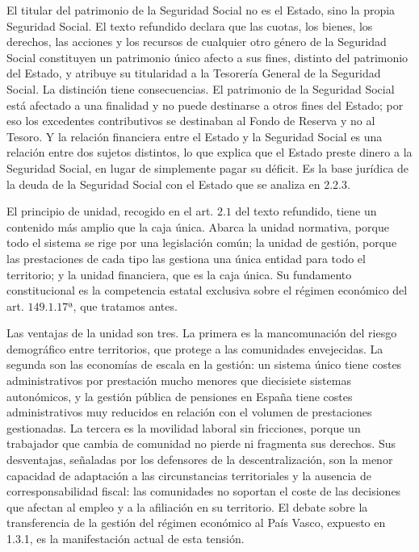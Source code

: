 \documentclass[10pt,a4paper]{article}
\begin{document}
El titular del patrimonio de la Seguridad Social no es el Estado, sino la propia Seguridad Social. El texto refundido declara que las cuotas, los bienes, los derechos, las acciones y los recursos de cualquier otro género de la Seguridad Social constituyen un patrimonio único afecto a sus fines, distinto del patrimonio del Estado, y atribuye su titularidad a la Tesorería General de la Seguridad Social. La distinción tiene consecuencias. El patrimonio de la Seguridad Social está afectado a una finalidad y no puede destinarse a otros fines del Estado; por eso los excedentes contributivos se destinaban al Fondo de Reserva y no al Tesoro. Y la relación financiera entre el Estado y la Seguridad Social es una relación entre dos sujetos distintos, lo que explica que el Estado preste dinero a la Seguridad Social, en lugar de simplemente pagar su déficit. Es la base jurídica de la deuda de la Seguridad Social con el Estado que se analiza en 2.2.3.

El principio de unidad, recogido en el art. $2.1$ del texto refundido, tiene un contenido más amplio que la caja única. Abarca la unidad normativa, porque todo el sistema se rige por una legislación común; la unidad de gestión, porque las prestaciones de cada tipo las gestiona una única entidad para todo el territorio; y la unidad financiera, que es la caja única. Su fundamento constitucional es la competencia estatal exclusiva sobre el régimen económico del art. $149.1.17$ª, que tratamos antes.

Las ventajas de la unidad son tres. La primera es la mancomunación del riesgo demográfico entre territorios, que protege a las comunidades envejecidas. La segunda son las economías de escala en la gestión: un sistema único tiene costes administrativos por prestación mucho menores que diecisiete sistemas autonómicos, y la gestión pública de pensiones en España tiene costes administrativos muy reducidos en relación con el volumen de prestaciones gestionadas. La tercera es la movilidad laboral sin fricciones, porque un trabajador que cambia de comunidad no pierde ni fragmenta sus derechos. Sus desventajas, señaladas por los defensores de la descentralización, son la menor capacidad de adaptación a las circunstancias territoriales y la ausencia de corresponsabilidad fiscal: las comunidades no soportan el coste de las decisiones que afectan al empleo y a la afiliación en su territorio. El debate sobre la transferencia de la gestión del régimen económico al País Vasco, expuesto en 1.3.1, es la manifestación actual de esta tensión.
\end{document}
